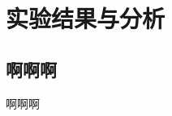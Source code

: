 \documentclass{standalone}
\begin{document}
	
\chapter{实验结果与分析}
\label{chap5}

\section{啊啊啊}

啊啊啊
\end{document}
